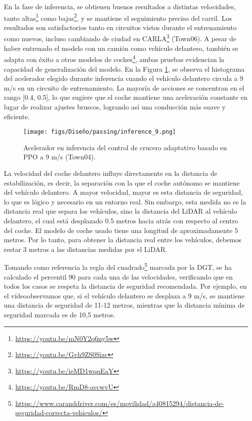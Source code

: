 En la fase de inferencia, se obtienen buenos resultados a distintas velocidades, tanto altas\footnote{\url{https://youtu.be/mN0Y2q6ny5w}} como bajas\footnote{\url{https://youtu.be/Gvh9ZS0Sizc}}, y se mantiene el seguimiento preciso del carril. Los resultados son satisfactorios tanto en circuitos vistos durante el entrenamiento como nuevos, incluso cambiando de ciudad en CARLA\footnote{\url{https://youtu.be/ieMD1wqqEaY}} (Town06). A pesar de haber entrenado el modelo con un camión como vehículo delantero, también se adapta con éxito a otros modelos de coches\footnote{\url{https://youtu.be/RmD8-avcwvU}}, ambas pruebas evidencian la capacidad de generalización del modelo. En la Figura \ref{fig:infrence_passing}, se observa el histograma del acelerador elegido durante inferencia cuando el vehículo delantero circula a 9 m/s en un circuito de entrenamiento. La mayoría de acciones se concentran en el rango [0.4, 0.5], lo que sugiere que el coche mantiene una aceleración constante en lugar de realizar ajustes bruscos, logrando así una conducción más suave y eficiente.

\begin{figure}[ht]
\centering
\texttt{[image: figs/Diseño/passing/inference\_9.png]}
\caption{Acelerador en inferencia del control de crucero adaptativo basado en \ac{PPO} a 9 m/s (Town04).}
\label{fig:infrence_passing}
\end{figure}

\newpage

La velocidad del coche delantero influye directamente en la distancia de estabilización, es decir, la separación con la que el coche autónomo se mantiene del vehículo delantero. A mayor velocidad, mayor es esta distancia de seguridad, lo que es lógico y necesario en un entorno real. Sin embargo, esta medida no es la distancia real que separa los vehículos, sino la distancia del \ac{LiDAR} al vehículo delantero, el cual está desplazado 0.5 metros hacia atrás con respecto al centro del coche. El modelo de coche usado tiene una longitud de aproximadamente 5 metros. Por lo tanto, para obtener la distancia real entre los vehículos, debemos restar 3 metros a las distancias medidas por el \ac{LiDAR}.

Tomando como referencia la regla del cuadrado\footnote{\url{https://www.caranddriver.com/es/movilidad/a40815294/distancia-de-seguridad-correcta-vehiculos/}} marcada por la \ac{DGT}, se ha calculado el percentil 90 para cada una de las velocidades, verificando que en todos los casos se respeta la distancia de seguridad recomendada. Por ejemplo, en el vídeo\footnotemark[12] observamos que, si el vehículo delantero se desplaza a 9 m/s, se mantiene una distancia de seguridad de 11-12 metros, mientras que la distancia mínima de seguridad marcada es de 10,5 metros.

